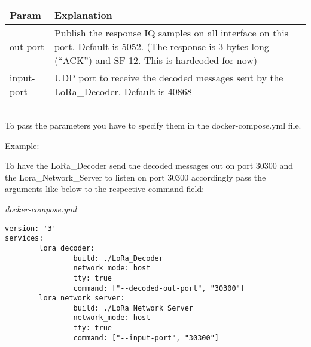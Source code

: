 \begin{longtable}[]{@{}ll@{}}
\toprule
\begin{minipage}[b]{0.18\columnwidth}\raggedright\strut
Param\strut
\end{minipage} & \begin{minipage}[b]{0.18\columnwidth}\raggedright\strut
Explanation\strut
\end{minipage}\tabularnewline
\midrule
\endhead
\begin{minipage}[t]{0.18\columnwidth}\raggedright\strut
out-port\strut
\end{minipage} & \begin{minipage}[t]{0.18\columnwidth}\raggedright\strut
Publish the response IQ samples on all interface on this port. Default
is 5052. (The response is 3 bytes long (``ACK'') and SF 12. This is
hardcoded for now)\strut
\end{minipage}\tabularnewline
\begin{minipage}[t]{0.18\columnwidth}\raggedright\strut
input-port\strut
\end{minipage} & \begin{minipage}[t]{0.18\columnwidth}\raggedright\strut
UDP port to receive the decoded messages sent by the LoRa\_Decoder.
Default is 40868\strut
\end{minipage}\tabularnewline
\bottomrule
\end{longtable}

\begin{center}\rule{0.5\linewidth}{\linethickness}\end{center}

To pass the parameters you have to specify them in the
docker-compose.yml file.

Example:

To have the LoRa\_Decoder send the decoded messages out on port 30300
and the Lora\_Network\_Server to listen on port 30300 accordingly pass
the arguments like below to the respective command field:

\emph{docker-compose.yml}

\begin{verbatim}
version: '3'
services:
        lora_decoder:
                build: ./LoRa_Decoder
                network_mode: host
                tty: true
                command: ["--decoded-out-port", "30300"]
        lora_network_server:
                build: ./LoRa_Network_Server
                network_mode: host
                tty: true
                command: ["--input-port", "30300"] 
\end{verbatim}

